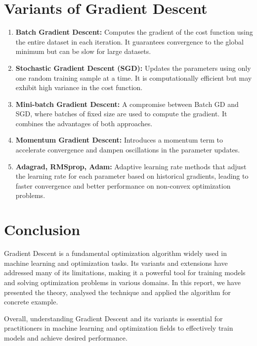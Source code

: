 \documentclass{article}
\begin{document}
\section{Variants of Gradient Descent}
\begin{enumerate}
    \item \textbf{Batch Gradient Descent:} Computes the gradient of the cost function using the entire dataset in each iteration. It guarantees convergence to the global minimum but can be slow for large datasets.
    \item \textbf{Stochastic Gradient Descent (SGD):} Updates the parameters using only one random training sample at a time. It is computationally efficient but may exhibit high variance in the cost function.
    \item \textbf{Mini-batch Gradient Descent:} A compromise between Batch GD and SGD, where batches of fixed size are used to compute the gradient. It combines the advantages of both approaches.
    \item \textbf{Momentum Gradient Descent:} Introduces a momentum term to accelerate convergence and dampen oscillations in the parameter updates.
    \item \textbf{Adagrad, RMSprop, Adam:} Adaptive learning rate methods that adjust the learning rate for each parameter based on historical gradients, leading to faster convergence and better performance on non-convex optimization problems.
\end{enumerate}

\section{Conclusion}
Gradient Descent is a fundamental optimization algorithm widely used in machine learning and optimization tasks. Its variants and extensions have addressed many of its limitations, making it a powerful tool for training models and solving optimization problems in various domains. In this report, we have presented the theory, analysed the technique and applied the algorithm for concrete example.

Overall, understanding Gradient Descent and its variants is essential for practitioners in machine learning and optimization fields to effectively train models and achieve desired performance.
\end{document}
